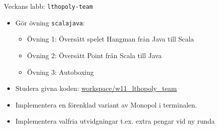 


\begin{Slide}{Veckans labb: \texttt{lthopoly-team}}\SlideFontSmall
{}
\begin{itemize}
\item Gör övning \texttt{scalajava}:
\begin{itemize}\SlideFontSmall
\item Övning 1: Översätt spelet Hangman från Java till Scala
\item Övning 2: Översätt Point från Scala till Java
\item Övning 3: Autoboxing
\end{itemize}
\item Studera givna koden: {%
 \href{https://github.com/lunduniversity/introprog/tree/master/workspace/w11_lthopoly_team/src/main}{workspace/w11\_lthopoly\_team}}
\end{itemize}
\begin{itemize}
\item Implementera en förenklad variant av Monopol i terminalen.
\end{itemize}
\begin{itemize}
\item Implementera valfria utvidgningar t.ex. extra pengar vid ny runda
\end{itemize}
\end{Slide}













